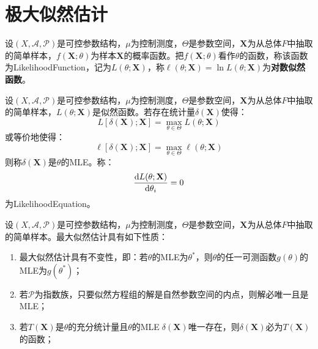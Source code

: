 \section{极大似然估计}

\begin{definition}
	设$(X,\mathscr{A},\mathscr{P})$是可控参数结构，$\mu$为控制测度，$\Theta$是参数空间，$\mathbf{X}$为从总体$F$中抽取的简单样本，$f(\mathbf{X};\theta)$为样本$\mathbf{X}$的概率函数。把$f(\mathbf{X};\theta)$看作$\theta$的函数，称该函数为\gls{LikelihoodFunction}，记为$L(\theta;\mathbf{X})$，称$\ell(\theta;\mathbf{X})=\ln L(\theta;\mathbf{X})$为\textbf{对数似然函数}。
\end{definition}
\begin{definition}
	设$(X,\mathscr{A},\mathscr{P})$是可控参数结构，$\mu$为控制测度，$\Theta$是参数空间，$\mathbf{X}$为从总体$F$中抽取的简单样本，$L(\theta;\mathbf{X})$是似然函数。若存在统计量$\delta(\mathbf{X})$使得：
	\begin{equation*}
		L[\delta(\mathbf{X});\mathbf{X}]=\max_{\theta\in\Theta}L(\theta;\mathbf{X})
	\end{equation*}
	或等价地使得：
	\begin{equation*}
		\ell[\delta(\mathbf{X});\mathbf{X}]=\max_{\theta\in\Theta}\ell(\theta;\mathbf{X})
	\end{equation*}
	则称$\delta(\mathbf{X})$是$\theta$的\gls{MLE}。称：
	\begin{equation*}
		\frac{\mathop{}\!\mathrm{d} L(\theta;\mathbf{X})}{\mathop{}\!\mathrm{d}\theta_i}=0
	\end{equation*}
	为\gls{LikelihoodEquation}。
\end{definition}
\begin{property}\label{prop:MLE}
	设$(X,\mathscr{A},\mathscr{P})$是可控参数结构，$\mu$为控制测度，$\Theta$是参数空间，$\mathbf{X}$为从总体$F$中抽取的简单样本。最大似然估计具有如下性质：
	\begin{enumerate}
		\item 最大似然估计具有不变性，即：若$\theta$的MLE为$\theta^*$，则$\theta$的任一可测函数$g(\theta)$的MLE为$g(\theta^*)$；
		\item 若$\mathscr{P}$为指数族，只要似然方程组的解是自然参数空间的内点，则解必唯一且是MLE；
		\item 若$T(\mathbf{X})$是$\theta$的充分统计量且$\theta$的MLE$\;\delta(\mathbf{X})$唯一存在，则$\delta(\mathbf{X})$必为$T(\mathbf{X})$的函数；
	\end{enumerate}
\end{property}